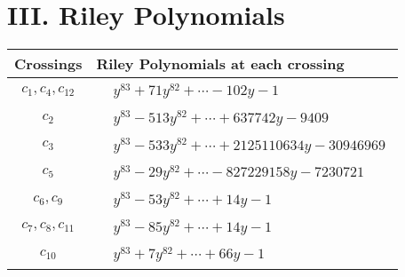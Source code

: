 \documentclass[1p]{elsarticle_modified}
\theoremstyle{definition}
\begin{document}
\centering \section*{ III. Riley Polynomials}
\begin{tabular}{m{50pt}|m{274pt}}
Crossings & \hspace{64pt}Riley Polynomials at each crossing \\
\hline $$\begin{aligned}c_{1},c_{4},c_{12}\end{aligned}$$&$\begin{aligned}
&y^{83}+71 y^{82}+\cdots-102 y-1
\end{aligned}$\\
\hline $$\begin{aligned}c_{2}\end{aligned}$$&$\begin{aligned}
&y^{83}-513 y^{82}+\cdots+637742 y-9409
\end{aligned}$\\
\hline $$\begin{aligned}c_{3}\end{aligned}$$&$\begin{aligned}
&y^{83}-533 y^{82}+\cdots+2125110634 y-30946969
\end{aligned}$\\
\hline $$\begin{aligned}c_{5}\end{aligned}$$&$\begin{aligned}
&y^{83}-29 y^{82}+\cdots-827229158 y-7230721
\end{aligned}$\\
\hline $$\begin{aligned}c_{6},c_{9}\end{aligned}$$&$\begin{aligned}
&y^{83}-53 y^{82}+\cdots+14 y-1
\end{aligned}$\\
\hline $$\begin{aligned}c_{7},c_{8},c_{11}\end{aligned}$$&$\begin{aligned}
&y^{83}-85 y^{82}+\cdots+14 y-1
\end{aligned}$\\
\hline $$\begin{aligned}c_{10}\end{aligned}$$&$\begin{aligned}
&y^{83}+7 y^{82}+\cdots+66 y-1
\end{aligned}$\\
\hline
\end{tabular}
\vskip 2pc
\end{document}
